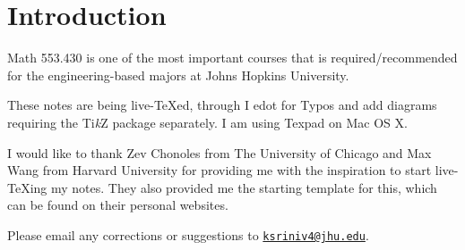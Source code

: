 \documentclass[11pt]{article}
\author{Lectures by \lecturer\\ Notes by \notetaker}
\title{\coursetitle}
\date{\institution\\ \courseterm}
\makeatletter
\newcommand{\notetakersemail}{ksriniv4@jhu.edu}
\newcounter{lecture}       \setcounter{lecture}{-1}
\theoremstyle{definition}
\makeatother
\begin{document}
	

\maketitle
{}
\thispagestyle{empty}
\setcounter{page}{-1}
\vspace{0.3in}



%
\begin{center}
\begin{minipage}[t]{0.9\textwidth}
\begin{multicols}{2}
\tableofcontents
\end{multicols}
\end{minipage}
\end{center}



\newpage
\thispdfpagelabel{-}
\thispagestyle{empty}


\section*{Introduction}
Math 553.430 is one of the most important courses that is required/recommended for the engineering-based majors at Johns Hopkins University.

These notes are being live-TeXed, through I edot for Typos and add diagrams requiring the Ti\textit{k}Z package separately. I am using Texpad on Mac OS X.

I would like to thank Zev Chonoles from The University of Chicago and Max Wang from Harvard University for providing me with the inspiration to start live-TeXing my notes. They also provided me the starting template for this, which can be found on their personal websites.

Please email any corrections or suggestions to \expandafter\href{mailto:\notetakersemail}{\texttt{\notetakersemail}}.
	
	
\newpage




















	
\end{document}
